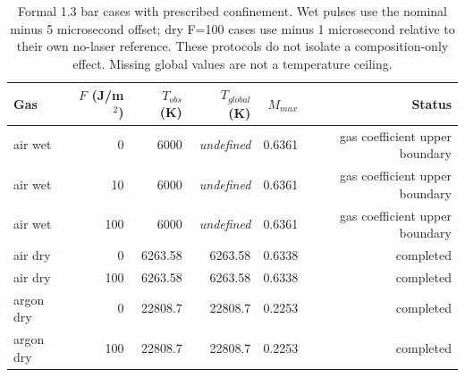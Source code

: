 \begin{table}[H]\centering\small
\begin{tabular}{lrrrrr}
\toprule
Gas & $F$ (J/m$^2$) & $T_{obs}$ (K) & $T_{global}$ (K) & $M_{max}$ & Status \\ \midrule
air wet & 0 & 6000 & \textit{undefined} & 0.6361 & gas coefficient upper boundary \\
air wet & 10 & 6000 & \textit{undefined} & 0.6361 & gas coefficient upper boundary \\
air wet & 100 & 6000 & \textit{undefined} & 0.6361 & gas coefficient upper boundary \\
air dry & 0 & 6263.58 & 6263.58 & 0.6338 & completed \\
air dry & 100 & 6263.58 & 6263.58 & 0.6338 & completed \\
argon dry & 0 & 22808.7 & 22808.7 & 0.2253 & completed \\
argon dry & 100 & 22808.7 & 22808.7 & 0.2253 & completed \\
\bottomrule\end{tabular}
\caption{Formal 1.3 bar cases with prescribed confinement. Wet pulses use the nominal minus 5 microsecond offset; dry F=100 cases use minus 1 microsecond relative to their own no-laser reference. These protocols do not isolate a composition-only effect. Missing global values are not a temperature ceiling.}
\end{table}
